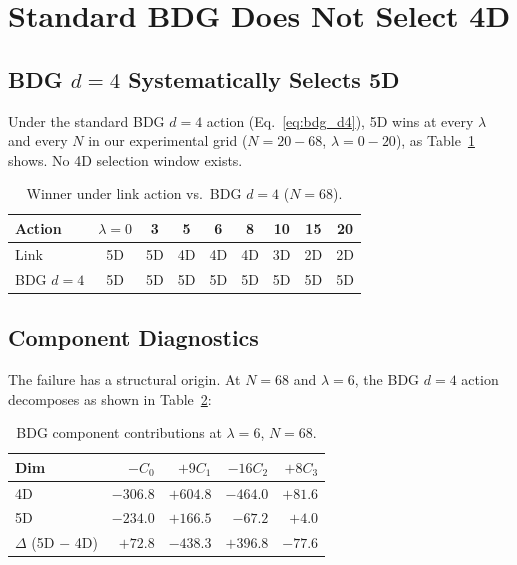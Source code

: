 \documentclass[12pt,a4paper]{article}
\begin{document}
\section{Standard BDG Does Not Select 4D}
\label{sec:bdg_failure}

\subsection{BDG $d{=}4$ Systematically Selects 5D}
\label{sec:bdg_5d}

Under the standard BDG $d{=}4$ action (Eq.~\ref{eq:bdg_d4}), 5D wins at every $\lambda$
and every $N$ in our experimental grid ($N = 20{-}68$, $\lambda = 0{-}20$),
as Table~\ref{tab:link_vs_bdg} shows.
No 4D selection window exists.

\begin{table}[htbp]
\centering
\caption{Winner under link action vs.\ BDG $d{=}4$ ($N = 68$).}
\label{tab:link_vs_bdg}
\begin{tabular}{@{}lcccccccc@{}}
\toprule
Action & $\lambda{=}0$ & 3 & 5 & 6 & 8 & 10 & 15 & 20 \\
\midrule
Link & 5D & 5D & 4D & 4D & 4D & 3D & 2D & 2D \\
BDG $d{=}4$ & 5D & 5D & 5D & 5D & 5D & 5D & 5D & 5D \\
\bottomrule
\end{tabular}
\end{table}

\subsection{Component Diagnostics}
\label{sec:component_diag}

The failure has a structural origin. At $N = 68$ and $\lambda = 6$,
the BDG $d{=}4$ action decomposes as shown in Table~\ref{tab:bdg_components}:

\begin{table}[htbp]
\centering
\caption{BDG component contributions at $\lambda = 6$, $N = 68$.}
\label{tab:bdg_components}
\begin{tabular}{@{}lrrrr@{}}
\toprule
Dim & $-C_0$ & $+9C_1$ & $-16C_2$ & $+8C_3$ \\
\midrule
4D & $-306.8$ & $+604.8$ & $-464.0$ & $+81.6$ \\
5D & $-234.0$ & $+166.5$ & $-67.2$ & $+4.0$ \\
\midrule
$\Delta$ (5D $-$ 4D) & $+72.8$ & $-438.3$ & $+396.8$ & $-77.6$ \\
\bottomrule
\end{tabular}
\end{table}
\end{document}
